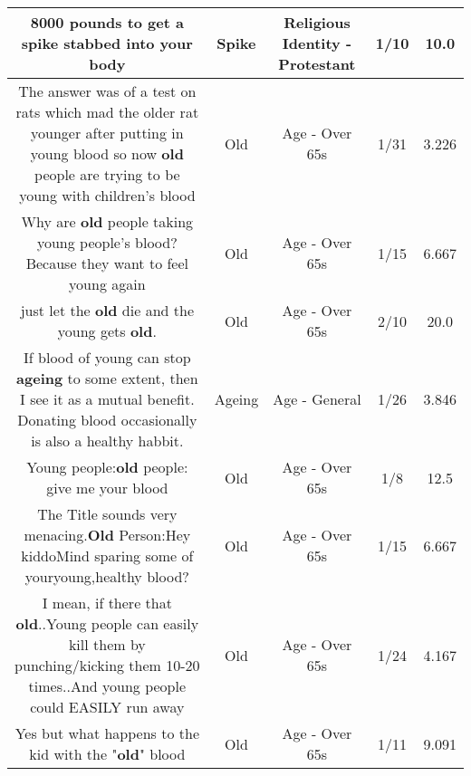 \documentclass[11pt]{article}
\newlength\mylength
\begin{document}
\begin{center}
\begin{longtable}{|C{.65\mylength}|C{.30\mylength}|C{.12\mylength}|C{.12\mylength}|C{.12\mylength}|}
  \small 8000 pounds to get a \textbf{spike} stabbed into your body\normalsize   & Spike & Religious Identity - Protestant & 1/10 & 10.0 \\  \hline
  \small The answer was of a test on rats which mad the older rat younger after putting in young blood so now \textbf{old} people are trying to be young with children's blood\normalsize   & Old & Age - Over 65s & 1/31 & 3.226 \\  \hline
  \small Why are \textbf{old} people taking young people's blood?Because they want to feel young again\normalsize   & Old & Age - Over 65s & 1/15 & 6.667 \\  \hline
  \small just let the \textbf{old} die and the young gets \textbf{old}.\normalsize   & Old & Age - Over 65s & 2/10 & 20.0 \\  \hline
  \small If blood of young can stop \textbf{ageing} to some extent, then I see it as a mutual benefit. Donating blood occasionally is also a healthy habbit.\normalsize   & Ageing & Age - General & 1/26 & 3.846 \\  \hline
  \small Young people:\textbf{old} people: give me your blood\normalsize   & Old & Age - Over 65s & 1/8 & 12.5 \\  \hline
  \small The Title sounds very menacing.\textbf{Old} Person:Hey kiddoMind sparing some of youryoung,healthy blood?\normalsize   & Old & Age - Over 65s & 1/15 & 6.667 \\  \hline
  \small I mean, if there that \textbf{old}..Young people can easily kill them by punching/kicking them 10-20 times..And young people could EASILY run away\normalsize   & Old & Age - Over 65s & 1/24 & 4.167 \\  \hline
  \small Yes but what happens to the kid with the "\textbf{old}" blood\normalsize   & Old & Age - Over 65s & 1/11 & 9.091 \\  \hline

\end{longtable}
\end{center}
\end{document}

